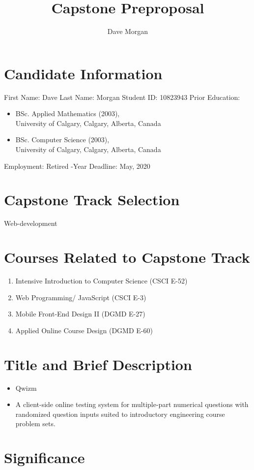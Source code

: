\documentclass{article}
\begin{document}
\title{Capstone Preproposal}
\author{Dave Morgan}
\maketitle
\thispagestyle{empty}
\section{Candidate Information}
\parb
First Name: Dave \parb
Last Name: Morgan \parb
Student ID: 10823943 \parb
Prior Education:
\begin{itemize}
  \item BSc. Applied Mathematics (2003), \\
  University of Calgary, Calgary, Alberta, Canada
  \item
  BSc. Computer Science (2003), \\
  University of Calgary, Calgary, Alberta, Canada
\end{itemize}
Employment: Retired -Year Deadline: May, 2020
\parb

\section{Capstone Track Selection}
\parb
Web-development
\parb

\section{Courses Related to Capstone Track}
\parb
\begin{enumerate}
  \item Intensive Introduction to Computer Science (CSCI E-52)
  \item Web Programming/ JavaScript (CSCI E-3)
  \item Mobile Front-End Design II (DGMD E-27)
  \item Applied Online Course Design (DGMD E-60)
\end{enumerate}

\section{Title and Brief Description}
\parb
  \begin{itemize}
    \item Qwizm
    \item A client-side online testing system for multiple-part numerical questions with randomized question inputs suited to introductory engineering course problem sets.
  \end{itemize}

\section{Significance}
\parb
\end{document}

